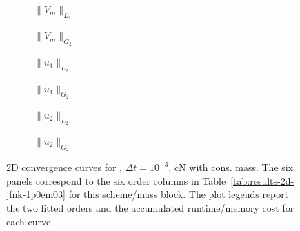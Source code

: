 \begin{figure}[p]
\centering
\begin{subfigure}{0.485\linewidth}
\centering
{}
\caption{$\|V_m\|_{L_2}$}
\label{fig:results-2d-jfnk-1p0em03-cranknicolson-consistent-a}
\end{subfigure}
\hfill
\begin{subfigure}{0.485\linewidth}
\centering
{}
\caption{$\|V_m\|_{G_2}$}
\label{fig:results-2d-jfnk-1p0em03-cranknicolson-consistent-b}
\end{subfigure}
\par\vspace{0.8em}
\begin{subfigure}{0.485\linewidth}
\centering
{}
\caption{$\|u_1\|_{L_2}$}
\label{fig:results-2d-jfnk-1p0em03-cranknicolson-consistent-c}
\end{subfigure}
\hfill
\begin{subfigure}{0.485\linewidth}
\centering
{}
\caption{$\|u_1\|_{G_2}$}
\label{fig:results-2d-jfnk-1p0em03-cranknicolson-consistent-d}
\end{subfigure}
\par\vspace{0.8em}
\begin{subfigure}{0.485\linewidth}
\centering
{}
\caption{$\|u_2\|_{L_2}$}
\label{fig:results-2d-jfnk-1p0em03-cranknicolson-consistent-e}
\end{subfigure}
\hfill
\begin{subfigure}{0.485\linewidth}
\centering
{}
\caption{$\|u_2\|_{G_2}$}
\label{fig:results-2d-jfnk-1p0em03-cranknicolson-consistent-f}
\end{subfigure}
\caption{2D convergence curves for , $\Delta t=10^{-3}$, cN with cons. mass. The six panels correspond to the six order columns in Table~\ref{tab:results-2d-jfnk-1p0em03} for this scheme/mass block. The plot legends report the two fitted orders and the accumulated runtime/memory cost for each curve.}
\label{fig:results-2d-jfnk-1p0em03-cranknicolson-consistent}
\end{figure}
\FloatBarrier

